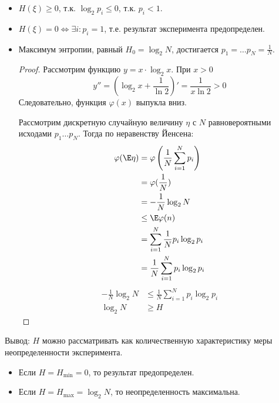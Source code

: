 \begin{prop}\itemfix
    \begin{itemize}
        \item \(H(\xi) \geq 0\), т.к. \(\log_2 p_i \leq 0\), т.к. \(p_i < 1\).
        \item \(H(\xi) = 0 \Leftrightarrow \exists i : p_i = 1\), т.е. результат эксперимента предопределен.
        \item Максимум энтропии, равный \(H_0 = \log_2 N\), достигается \(p_1 = \dots p_N = \frac{1}{N}\).
              \begin{proof}
                  Рассмотрим функцию \(y = x \cdot \log_2 x\). При \(x > 0\)
                  \[y'' = \left(\log_2 x + \frac{1}{\ln 2}\right)' = \frac{1}{x \ln 2} > 0\]
                  Следовательно, функция \(\varphi(x)\) выпукла вниз.

                  Рассмотрим дискретную случайную величину \(\eta\) с \(N\) равновероятными исходами \(p_1 \dots p_N\). Тогда по неравенству Йенсена:
                  \begin{align*}
                      \varphi(\E \eta)
                       & = \varphi \left(\frac{1}{N} \sum_{i=1}^{N} p_i\right) \\
                       & = \varphi (\frac{1}{N})                               \\
                       & = - \frac{1}{N} \log_2 N                              \\
                       & \leq \E \varphi(n)                                    \\
                       & = \sum_{i=1}^{N} \frac{1}{N} p_i \log_2 p_i           \\
                       & = \frac{1}{N} \sum_{i=1}^{N} p_i \log_2 p_i
                  \end{align*}
                  \begin{align*}
                      - \frac{1}{N} \log_2 N & \leq \frac{1}{N} \sum_{i=1}^{N} p_i \log_2 p_i \\
                      \log_2 N               & \geq H
                  \end{align*}
              \end{proof}
    \end{itemize}
\end{prop}

Вывод: \(H\) можно рассматривать как количественную характеристику меры неопределенности эксперимента.
\begin{itemize}
    \item Если \(H = H_{\min} = 0\), то результат предопределен.
    \item Если \(H = H_{\max} = \log_2 N\), то неопределенность максимальна.
\end{itemize}

